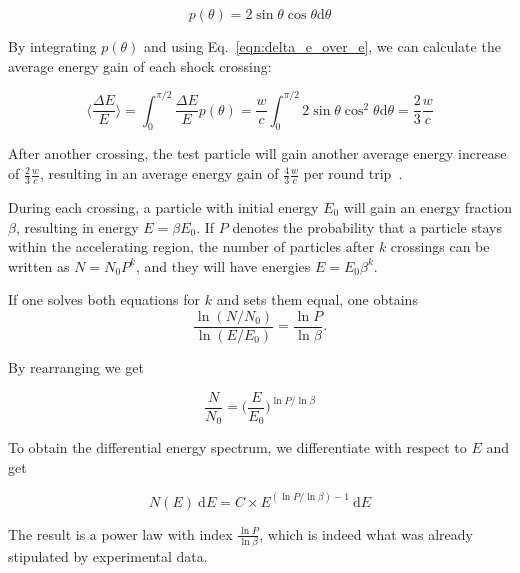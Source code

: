 \begin{equation}
    p(\theta) = 2\sin{\theta}\cos{\theta} \text{d}\theta
\end{equation}

By integrating $p(\theta)$ and using Eq.~\ref{eqn:delta_e_over_e}, we can calculate the average energy gain of each shock crossing:

\begin{equation}
    \bigg\langle \frac{\Delta E}{E} \bigg\rangle = \int_0^{\pi/2} \frac{\Delta E}{E} p(\theta) = \frac{w}{c} \int_0^{\pi/2} 2 \sin{\theta} \cos^2{\theta}  \text{d}\theta = \frac{2}{3}\frac{w}{c}
\end{equation}

After another crossing, the test particle will gain another average energy increase of $\frac{2}{3}\frac{w}{c}$, resulting in an average energy gain of $\frac{4}{3}\frac{w}{c}$ per round trip~\cite{Longair2011}.

During each crossing, a particle with initial energy $E_0$ will gain an energy fraction $\beta$, resulting in energy $E=\beta E_0$. If $P$ denotes the probability that a particle stays within the accelerating region, the number of particles after $k$ crossings can be written as $N=N_0 P^k $, and they will have energies $E=E_0\beta^k$.

If one solves both equations for $k$ and sets them equal, one obtains
\begin{equation}
    \frac{\ln (N/N_0)}{\ln (E/E_0)} = \frac{\ln P}{\ln \beta}.
\end{equation}

By rearranging we get

\begin{equation}
    \frac{N}{N_0} = \bigg(\frac{E}{E_0}\bigg)^{\ln P / \ln \beta}
\end{equation}

To obtain the differential energy spectrum, we differentiate with respect to $E$ and get

\begin{equation}
    \label{eqn:diff_e_spec}
    N(E)~\text{d} E = C\times E^{(\ln P/\ln\beta)-1}~\text{d} E
\end{equation}

The result is a power law with index $\frac{\ln P}{\ln \beta}$, which is indeed what was already stipulated by experimental data.

